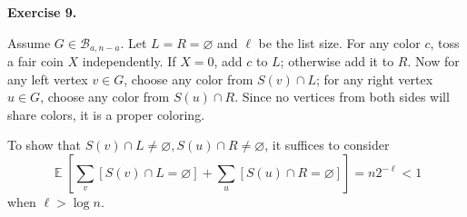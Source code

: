 \documentclass[a4paper]{article}
\newenvironment{exercise}[1]{
	\par
	\noindent\textbf{Exercise #1.}\quad
}{
	\par
	\bigskip
}
\DeclareMathOperator{\E}{\mathbb E}
\newcommand{\sbra}[1]{\left[ #1 \right]}
\newcommand{\Bcal}{\mathcal{B}}
\begin{document}
\begin{exercise}{9}
    Assume $G\in\Bcal_{a,n-a}$. Let $L=R=\varnothing$ and $\ell$ be the list size.
    For any color $c$, toss a fair coin $X$ independently. If $X=0$, add $c$ to $L$; otherwise add it to $R$.
    Now for any left vertex $v\in G$, choose any color from $S(v)\cap L$;
    for any right vertex $u\in G$, choose any color from $S(u)\cap R$.
    Since no vertices from both sides will share colors, it is a proper coloring.

    To show that $S(v)\cap L\neq\varnothing,S(u)\cap R\neq\varnothing$, it suffices to consider
    $$
    \E\sbra{\sum_v\sbra{S(v)\cap L=\varnothing}+\sum_u\sbra{S(u)\cap R=\varnothing}}=n2^{-\ell}<1
    $$
    when $\ell>\log n$.
\end{exercise}
\end{document}

